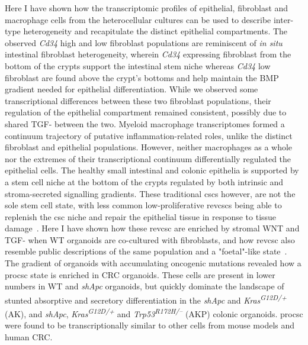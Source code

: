Here I have shown how the transcriptomic profiles of epithelial, fibroblast and macrophage cells from the heterocellular cultures can be used to describe inter-type heterogeneity and recapitulate the distinct epithelial compartments. 
The observed \emph{Cd34} high and low fibroblast populations are reminiscent of \emph{in situ} intestinal fibroblast heterogeneity, wherein \emph{Cd34} expressing fibroblast from the bottom of the crypts support the intestinal stem niche whereas \emph{Cd34} low fibroblast are found above the crypt's bottoms and help maintain the BMP gradient needed for epithelial differentiation. While we observed some transcriptional differences between these two fibroblast populations, their regulation of the epithelial compartment remained consistent, possibly due to shared TGF-\textbeta\hspace{0.1cm} between the two. 
Myeloid macrophage transcriptomes formed a continuum trajectory of putative inflammation-related roles, unlike the distinct fibroblast and epithelial populations. However, neither macrophages as a whole nor the extremes of their transcriptional continuum differentially regulated the epithelial cells.
The healthy small intestinal and colonic epithelia is supported by a stem cell niche at the bottom of the crypts regulated by both intrinsic and stroma-secreted signalling gradients. These traditional \acrfull{csc}s however, are not the sole stem cell state, with less common low-proliferative \acrfull{revcsc}s being able to replenish the \acrshort{csc} niche and repair the epithelial tissue in response to tissue damage~\cite{ayyaz_single-cell_2019}. Here I have shown how these \acrshort{revcsc} are enriched by stromal WNT and TGF-\textbeta\hspace{0.1cm} when WT organoids are co-cultured with fibroblasts, and how \acrshort{revcsc} also resemble public descriptions of the same population and a "foetal"-like state~\cite{mustata_identification_2013}.
The gradient of organoids with accumulating oncogenic mutations revealed how a \acrfull{procsc} state is enriched in CRC organoids. These cells are present in lower numbers in WT and \textit{shApc} organoids, but quickly dominate the landscape of stunted absorptive and secretory differentiation in the \textit{shApc} and \textit{Kras\textsuperscript{G12D/+}} (AK), and \textit{shApc}, \textit{Kras\textsuperscript{G12D/+}} and \textit{Trp53\textsuperscript{R172H/–}} (AKP) colonic organoids. \acrshort{procsc} were found to be transcriptionally similar to other cells from mouse models and human CRC.

